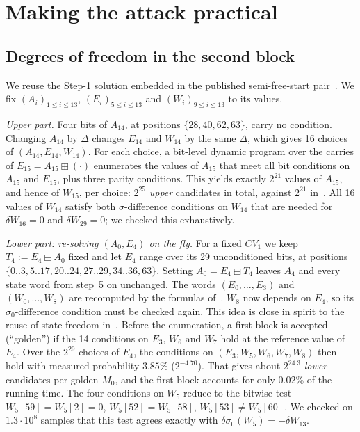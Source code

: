 \documentclass[11pt]{article}
\begin{document}
\section{Making the attack practical}\label{sec:impl}

\subsection{Degrees of freedom in the second block}

We reuse the Step-1 solution embedded in the published semi-free-start pair~\cite[Table~14]{LZLLQZ26}. We fix $(A_i)_{1\le i\le 13}$, $(E_i)_{5\le i\le 13}$ and $(W_i)_{9\le i\le 13}$ to its values.

\emph{Upper part.} Four bits of $A_{14}$, at positions $\{28,40,62,63\}$, carry no condition. Changing $A_{14}$ by $\Delta$ changes $E_{14}$ and $W_{14}$ by the same $\Delta$, which gives 16 choices of $(A_{14},E_{14},W_{14})$. For each choice, a bit-level dynamic program over the carries of $E_{15}=A_{15}\boxplus(\cdot)$ enumerates the values of $A_{15}$ that meet all bit conditions on $A_{15}$ and $E_{15}$, plus three parity conditions. This yields exactly $2^{21}$ values of $A_{15}$, and hence of $W_{15}$, per choice: $2^{25}$ \emph{upper} candidates in total, against $2^{21}$ in~\cite{LZLLQZ26}. All 16 values of $W_{14}$ satisfy both $\sigma$-difference conditions on $W_{14}$ that are needed for $\delta W_{16}=0$ and $\delta W_{29}=0$; we checked this exhaustively.

\emph{Lower part: re-solving $(A_0,E_4)$ on the fly.} For a fixed $\mathit{CV}_1$ we keep $T_4:=E_4\boxminus A_0$ fixed and let $E_4$ range over its 29 unconditioned bits, at positions $\{0..3,5..17,20..24,27..29,34..36,63\}$. Setting $A_0=E_4\boxminus T_4$ leaves $A_4$ and every state word from step~5 on unchanged. The words $(E_0,\dots,E_3)$ and $(W_0,\dots,W_8)$ are recomputed by the formulas of~\cite[Step~2]{LZLLQZ26}. $W_8$ now depends on $E_4$, so its $\sigma_0$-difference condition must be checked again. This idea is close in spirit to the reuse of state freedom in~\cite[Sect.~4]{LLWS26}. Before the enumeration, a first block is accepted (``golden'') if the 14 conditions on $E_3$, $W_6$ and $W_7$ hold at the reference value of $E_4$. Over the $2^{29}$ choices of $E_4$, the conditions on $(E_3,W_5,W_6,W_7,W_8)$ then hold with measured probability $3.85\%$ ($2^{-4.70}$). That gives about $2^{24.3}$ \emph{lower} candidates per golden $M_0$, and the first block accounts for only 0.02\% of the running time. The four conditions on $W_5$ reduce to the bitwise test $W_5[59]=W_5[2]=0$, $W_5[52]=W_5[58]$, $W_5[53]\neq W_5[60]$. We checked on $1.3\cdot 10^8$ samples that this test agrees exactly with $\delta\sigma_0(W_5)=-\delta W_{13}$.
\end{document}
